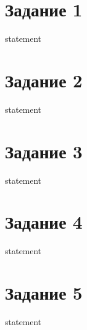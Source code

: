 \section{Задание 1}

{statement}

\section{Задание 2}

{statement}

\section{Задание 3}

{statement}

\section{Задание 4}

{statement}

\section{Задание 5}

{statement}